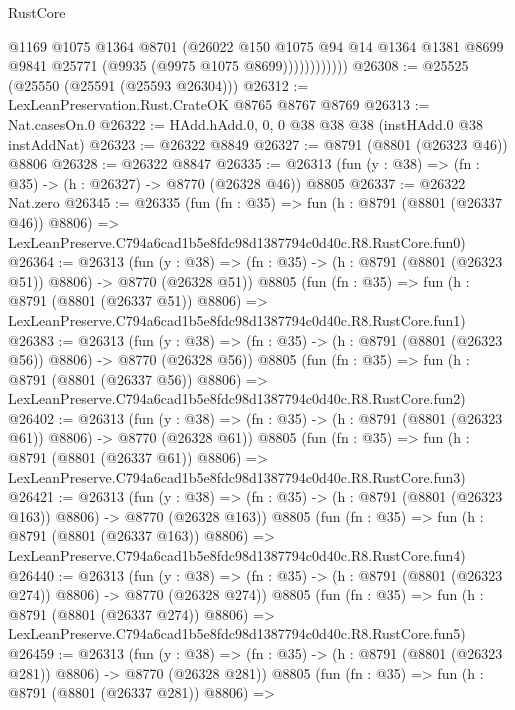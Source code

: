 \begin{lexlean}{RustCore}
\begin{coremodule}
                      @1169
                      @1075
                      @1364
                      @8701
                      (@26022
                        @150
                        @1075
                        @94
                        @14
                        @1364
                        @1381
                        @8699
                        @9841
                        @25771
                        (@9935 (@9975 @1075 @8699))))))))))))
@26308 := @25525 (@25550 (@25591 (@25593 @26304)))
@26312 := LexLeanPreservation.Rust.CrateOK @8765 @8767 @8769
@26313 := Nat.casesOn.{0}
@26322 := HAdd.hAdd.{0, 0, 0} @38 @38 @38 (instHAdd.{0} @38 instAddNat)
@26323 := @26322 @8849
@26327 := @8791 (@8801 (@26323 @46)) @8806
@26328 := @26322 @8847
@26335 := @26313 (fun (y : @38) => (fn : @35) -> (h : @26327) -> @8770 (@26328 @46)) @8805
@26337 := @26322 Nat.zero
@26345 := @26335
    (fun (fn : @35) =>
    fun (h : @8791 (@8801 (@26337 @46)) @8806) =>
    LexLeanPreserve.C794a6cad1b5e8fdc98d1387794c0d40c.R8.RustCore.fun0)
@26364 := @26313
    (fun (y : @38) => (fn : @35) -> (h : @8791 (@8801 (@26323 @51)) @8806) -> @8770 (@26328 @51))
    @8805
    (fun (fn : @35) =>
    fun (h : @8791 (@8801 (@26337 @51)) @8806) =>
    LexLeanPreserve.C794a6cad1b5e8fdc98d1387794c0d40c.R8.RustCore.fun1)
@26383 := @26313
    (fun (y : @38) => (fn : @35) -> (h : @8791 (@8801 (@26323 @56)) @8806) -> @8770 (@26328 @56))
    @8805
    (fun (fn : @35) =>
    fun (h : @8791 (@8801 (@26337 @56)) @8806) =>
    LexLeanPreserve.C794a6cad1b5e8fdc98d1387794c0d40c.R8.RustCore.fun2)
@26402 := @26313
    (fun (y : @38) => (fn : @35) -> (h : @8791 (@8801 (@26323 @61)) @8806) -> @8770 (@26328 @61))
    @8805
    (fun (fn : @35) =>
    fun (h : @8791 (@8801 (@26337 @61)) @8806) =>
    LexLeanPreserve.C794a6cad1b5e8fdc98d1387794c0d40c.R8.RustCore.fun3)
@26421 := @26313
    (fun (y : @38) => (fn : @35) -> (h : @8791 (@8801 (@26323 @163)) @8806) -> @8770 (@26328 @163))
    @8805
    (fun (fn : @35) =>
    fun (h : @8791 (@8801 (@26337 @163)) @8806) =>
    LexLeanPreserve.C794a6cad1b5e8fdc98d1387794c0d40c.R8.RustCore.fun4)
@26440 := @26313
    (fun (y : @38) => (fn : @35) -> (h : @8791 (@8801 (@26323 @274)) @8806) -> @8770 (@26328 @274))
    @8805
    (fun (fn : @35) =>
    fun (h : @8791 (@8801 (@26337 @274)) @8806) =>
    LexLeanPreserve.C794a6cad1b5e8fdc98d1387794c0d40c.R8.RustCore.fun5)
@26459 := @26313
    (fun (y : @38) => (fn : @35) -> (h : @8791 (@8801 (@26323 @281)) @8806) -> @8770 (@26328 @281))
    @8805
    (fun (fn : @35) =>
    fun (h : @8791 (@8801 (@26337 @281)) @8806) =>

\end{coremodule}
\end{lexlean}
